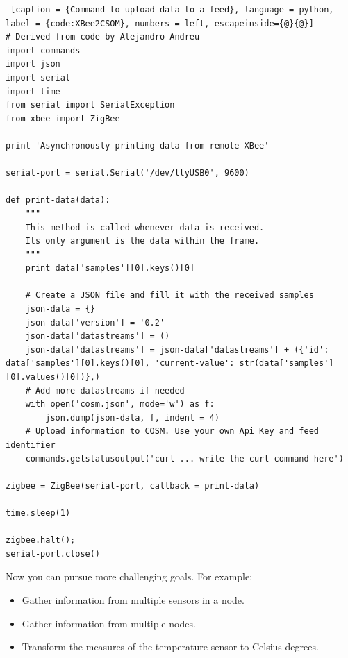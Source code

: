 \begin{lstlisting} [caption = {Command to upload data to a feed}, language = python, label = {code:XBee2CSOM}, numbers = left, escapeinside={@}{@}]
# Derived from code by Alejandro Andreu
import commands
import json
import serial
import time
from serial import SerialException
from xbee import ZigBee

print 'Asynchronously printing data from remote XBee'

serial-port = serial.Serial('/dev/ttyUSB0', 9600)

def print-data(data):
    """
    This method is called whenever data is received.
    Its only argument is the data within the frame.
    """
    print data['samples'][0].keys()[0]

    # Create a JSON file and fill it with the received samples
    json-data = {}
    json-data['version'] = '0.2'
    json-data['datastreams'] = ()
    json-data['datastreams'] = json-data['datastreams'] + ({'id': data['samples'][0].keys()[0], 'current-value': str(data['samples'][0].values()[0])},)
    # Add more datastreams if needed
    with open('cosm.json', mode='w') as f:
        json.dump(json-data, f, indent = 4)
    # Upload information to COSM. Use your own Api Key and feed identifier
    commands.getstatusoutput('curl ... write the curl command here')

zigbee = ZigBee(serial-port, callback = print-data)

time.sleep(1)

zigbee.halt();
serial-port.close()
\end{lstlisting}

Now you can pursue more challenging goals.
For example:
\begin{itemize}
\item Gather information from multiple sensors in a node.
\item Gather information from multiple nodes.
\item Transform the measures of the temperature sensor to Celsius degrees.
\end{itemize}

